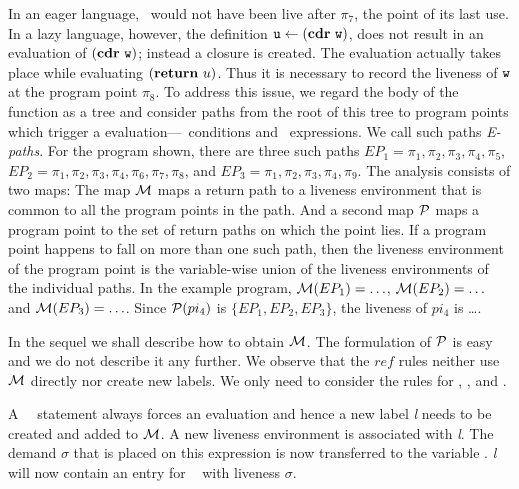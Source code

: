 \documentclass[10pt]{sigplanconf}
\begin{document}
In an  eager  language, \pw\  would  not have  been live  after
 $\pi_7$, the point of its last use. In a lazy language, however, the
  definition  $\mbox{\tt u}  \leftarrow  (\mbox{$\mathbf{cdr}$}~\mbox{\tt w})$,  does not  result  in  an
  evaluation  of  $(\mbox{$\mathbf{cdr}$}~\mbox{\tt w})$; instead  a  closure  is created.   The
  evaluation actually takes place while evaluating $(\mbox{$\mathbf{ return}$}~u)$. Thus
  it is necessary to record the liveness of $\mbox{\tt w}$ at the program point
  $\pi_8$.
  To address this issue, we  regard the body of the function as a
  tree and consider paths from the root of this tree to program points
  which     trigger     a     evaluation---\SIF\    conditions     and
  \RETURN\  expressions. We call  such paths  {\em E-paths}.   For the
  program  shown, there  are three  such paths  $EP_1 =  \pi_1, \pi_2,
  \pi_3,  \pi_4, \pi_5$, $EP_2  = \pi_1,  \pi_2, \pi_3,  \pi_4, \pi_6,
  \pi_7, \pi_8$, and $EP_3 =  \pi_1, \pi_2, \pi_3, \pi_4, \pi_9$.  The
  analysis consists of two maps:  The map $\cal{M}$ maps a return path
  to a liveness  environment that is common to  all the program points
  in the path. And a second  map $\cal{P}$ maps a program point to the
  set of  return paths on  which the point  lies.  If a  program point
  happens  to fall  on  more than  one  such path,  then the  liveness
  environment of the  program point is the variable-wise  union of the
  liveness  environments  of the  individual  paths.   In the  example
  program,  ${\cal  M}(EP_1)=  \ldots$,  ${\cal  M}(EP_2)=\ldots$  and
  ${\cal M}(EP_3)= \ldots$.  Since  ${\cal P}(pi_4)$ is $\lbrace EP_1,
  EP_2, EP_3 \rbrace$, the liveness of $pi_4$ is \ldots.

  In  the  sequel we  shall  describe  how  to obtain  $\cal{M}$.  The
  formulation  of $\cal{P}$  is easy  and we  do not  describe  it any
  further.
  We observe that the ${ref}$ rules neither use ${\cal M}$ directly nor 
  create new labels. We only need to consider the rules for {\LET}, {\SIF}, and
  {\RETURN}.

 
  A {\RETURN~\px}\  statement always forces an evaluation and hence a new 
  label {\em l} needs to be created and added to $\cal{M}$. A new liveness
  environment is associated with {\em l}. The demand $\sigma$ that is placed 
  on this expression is now transferred to the variable \px. {\em l} will now
  contain an entry for \px~ with liveness $\sigma$.
\end{document}
